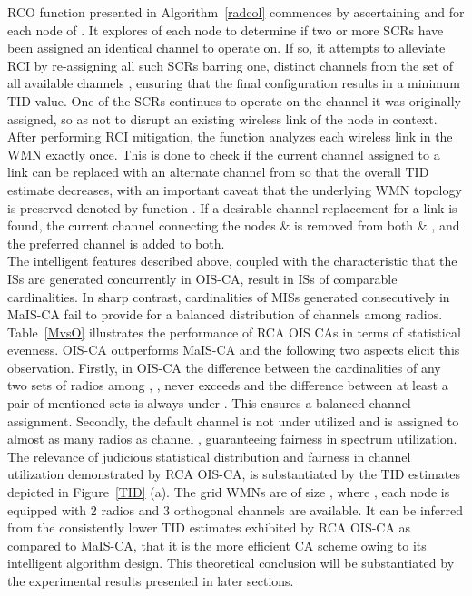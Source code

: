 \documentclass[conference]{IEEEtran}
\begin{document}
RCO function presented in Algorithm~\ref{radcol} commences by ascertaining  and  for each node  of . It explores  of each node to determine if two or more SCRs have been assigned an identical channel to operate on. If so, it attempts to alleviate RCI by re-assigning all such SCRs barring one, distinct channels from the set of all available channels , ensuring that the final configuration results in a minimum TID value. One of the SCRs continues to operate on the channel it was originally assigned, so as not to disrupt an existing wireless link of the node in context. After performing RCI mitigation, the function analyzes each wireless link in the WMN exactly once. This is done to check if the current channel assigned to a link can be replaced with an alternate channel  from  so that the overall TID estimate decreases, with an important caveat that the underlying WMN topology is preserved denoted by function . If a desirable channel 
replacement for a link is found, the current channel  connecting the nodes   \&  is removed from both  \& , and the preferred channel   is added to both.\\
The intelligent features described above, coupled with the characteristic that the ISs are generated concurrently in OIS-CA, result in ISs of comparable cardinalities. In sharp contrast, cardinalities of MISs generated consecutively in MaIS-CA fail to provide for a balanced distribution of channels among radios. Table~\ref{MvsO} illustrates the performance of RCA OIS CAs in terms of statistical evenness. OIS-CA outperforms MaIS-CA and the following two aspects elicit this observation. Firstly, in OIS-CA the difference between the cardinalities of any two sets of radios among ,   , never exceeds  and the difference between at least a pair of mentioned sets is always under . This ensures a balanced channel assignment. Secondly, the default channel  is not under utilized and is assigned to almost as many radios as channel , guaranteeing fairness in spectrum utilization. The relevance of judicious statistical distribution and fairness in channel utilization 
demonstrated by 
RCA OIS-CA, is substantiated by the TID estimates depicted in Figure~\ref{TID} (a). The grid WMNs are of size , where , each node is equipped with 2 radios and 3 orthogonal channels are available. It can be inferred from the consistently lower TID estimates exhibited by RCA OIS-CA as compared to MaIS-CA, that it is the more efficient CA scheme owing to its intelligent algorithm design. This theoretical conclusion will be substantiated by the experimental results presented in later sections.
\end{document}
